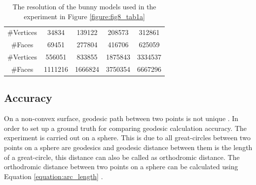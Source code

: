 \begin{table}[H]
         \small
            \centering
            \begin{tabular}{|c|c|c|c|c|}
                \hline
                \#Vertices&34834&139122&208573&312861\\
                \#Faces&69451&277804&416706&625059\\
                \hline
                \#Vertices&556051&833855&1875843&3334537\\
                \#Faces&1111216&1666824&3750354&6667296\\
                \hline
            \end{tabular}
	        \caption[Resolution of the bunny models]{The resolution of the bunny models used in the experiment in Figure \ref{figure:fig8_tab1a}}
        \label{table:fig8_tab1b} %
\end{table}


\subsection{Accuracy}
On a non-convex surface, geodesic path between two points is not unique . In order to set up a ground truth for comparing geodesic calculation accuracy. The experiment is carried out on a sphere. This is due to all great-circles between two points on a sphere are geodesics and geodesic distance between them is the length of a great-circle, this distance can also be called as orthodromic distance. The orthodromic distance between two points on a sphere can be calculated using Equation \ref{equation:arc_length} .


